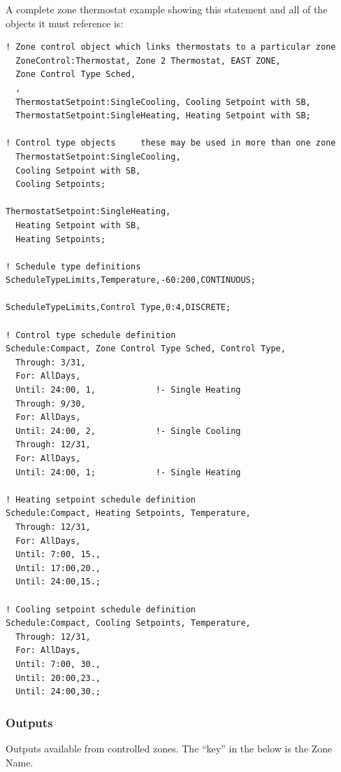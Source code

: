 A complete zone thermostat example showing this statement and all of the objects it must reference is:

\begin{lstlisting}
! Zone control object which links thermostats to a particular zone
  ZoneControl:Thermostat, Zone 2 Thermostat, EAST ZONE,
  Zone Control Type Sched,
  ,
  ThermostatSetpoint:SingleCooling, Cooling Setpoint with SB,
  ThermostatSetpoint:SingleHeating, Heating Setpoint with SB;

! Control type objects     these may be used in more than one zone
  ThermostatSetpoint:SingleCooling,
  Cooling Setpoint with SB,
  Cooling Setpoints;

ThermostatSetpoint:SingleHeating,
  Heating Setpoint with SB,
  Heating Setpoints;

! Schedule type definitions
ScheduleTypeLimits,Temperature,-60:200,CONTINUOUS;

ScheduleTypeLimits,Control Type,0:4,DISCRETE;

! Control type schedule definition
Schedule:Compact, Zone Control Type Sched, Control Type,
  Through: 3/31,
  For: AllDays,
  Until: 24:00, 1,            !- Single Heating
  Through: 9/30,
  For: AllDays,
  Until: 24:00, 2,            !- Single Cooling
  Through: 12/31,
  For: AllDays,
  Until: 24:00, 1;            !- Single Heating

! Heating setpoint schedule definition
Schedule:Compact, Heating Setpoints, Temperature,
  Through: 12/31,
  For: AllDays,
  Until: 7:00, 15.,
  Until: 17:00,20.,
  Until: 24:00,15.;

! Cooling setpoint schedule definition
Schedule:Compact, Cooling Setpoints, Temperature,
  Through: 12/31,
  For: AllDays,
  Until: 7:00, 30.,
  Until: 20:00,23.,
  Until: 24:00,30.;
\end{lstlisting}

\subsubsection{Outputs}\label{outputs-042}

Outputs available from controlled zones. The ``key'' in the below is the Zone Name.

